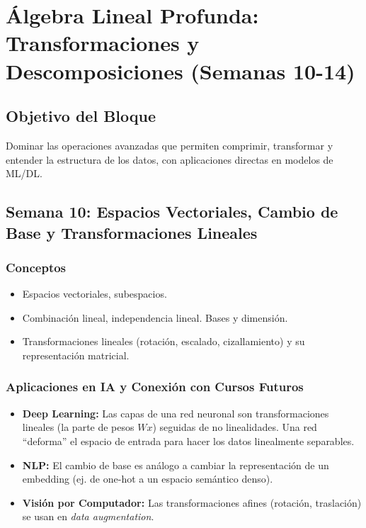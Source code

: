 \documentclass[12pt,a4paper,openany,oneside]{book}
\begin{document}
\chapter{Álgebra Lineal Profunda: Transformaciones y Descomposiciones (Semanas 10-14)}
\section*{Objetivo del Bloque}
Dominar las operaciones avanzadas que permiten comprimir, transformar y entender la estructura de los datos, con aplicaciones directas en modelos de ML/DL.

\section{Semana 10: Espacios Vectoriales, Cambio de Base y Transformaciones Lineales}

\subsection{Conceptos}
\begin{itemize}
    \item Espacios vectoriales, subespacios.
    \item Combinación lineal, independencia lineal. Bases y dimensión.
    \item Transformaciones lineales (rotación, escalado, cizallamiento) y su representación matricial.
\end{itemize}

\subsection{Aplicaciones en IA y Conexión con Cursos Futuros}
\begin{itemize}
    \item \textbf{Deep Learning:} Las capas de una red neuronal son transformaciones lineales (la parte de pesos \(Wx\)) seguidas de no linealidades. Una red ``deforma'' el espacio de entrada para hacer los datos linealmente separables.
    \item \textbf{NLP:} El cambio de base es análogo a cambiar la representación de un embedding (ej. de one-hot a un espacio semántico denso).
    \item \textbf{Visión por Computador:} Las transformaciones afines (rotación, traslación) se usan en \textit{data augmentation}.
\end{itemize}
\end{document}
